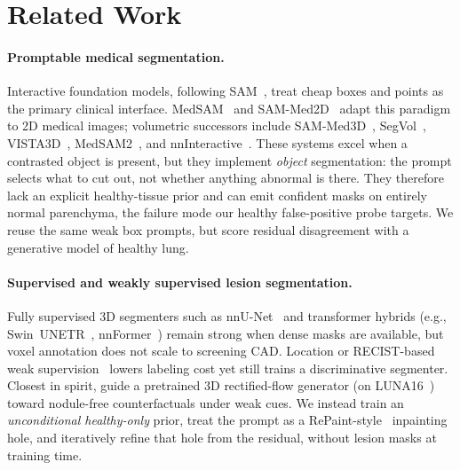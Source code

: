 \documentclass[letterpaper]{article} %
\begin{document}
\section{Related Work}
\label{sec:related}

\paragraph{Promptable medical segmentation.}
Interactive foundation models, following SAM~\citep{kirillov2023sam},
treat cheap boxes and points as the primary clinical interface.
MedSAM~\citep{medsam2024} and SAM-Med2D~\citep{sam_med2d2023} adapt
this paradigm to 2D medical images; volumetric successors include
SAM-Med3D~\citep{sam_med3d2023}, SegVol~\citep{segvol2024},
VISTA3D~\citep{vista3d2024}, MedSAM2~\citep{medsam2_2025}, and
nnInteractive~\citep{nninteractive2025}.
These systems excel when a contrasted object is present, but they
implement \emph{object} segmentation: the prompt selects what to cut
out, not whether anything abnormal is there.
They therefore lack an explicit healthy-tissue prior and can emit
confident masks on entirely normal parenchyma, the failure mode our
healthy false-positive probe targets.
We reuse the same weak box prompts, but score residual disagreement
with a generative model of healthy lung.

\paragraph{Supervised and weakly supervised lesion segmentation.}
Fully supervised 3D segmenters such as nnU-Net~\citep{nnunet2021}
and transformer hybrids (e.g., Swin~UNETR~\citep{swinunetr2022},
nnFormer~\citep{nnformer2021}) remain strong when dense masks are
available, but voxel annotation does not scale to screening CAD.
Location or RECIST-based weak supervision~\citep{deepem2018,zhou2023recist}
lowers labeling cost yet still trains a discriminative segmenter.
Closest in spirit, \citet{rectflow2026} guide a pretrained 3D
rectified-flow generator (on LUNA16~\citep{luna2017}) toward nodule-free
counterfactuals under weak cues.
We instead train an \emph{unconditional healthy-only} prior, treat the
prompt as a RePaint-style~\citep{lugmayr2022repaint} inpainting hole,
and iteratively refine that hole from the residual, without lesion
masks at training time.
\end{document}

